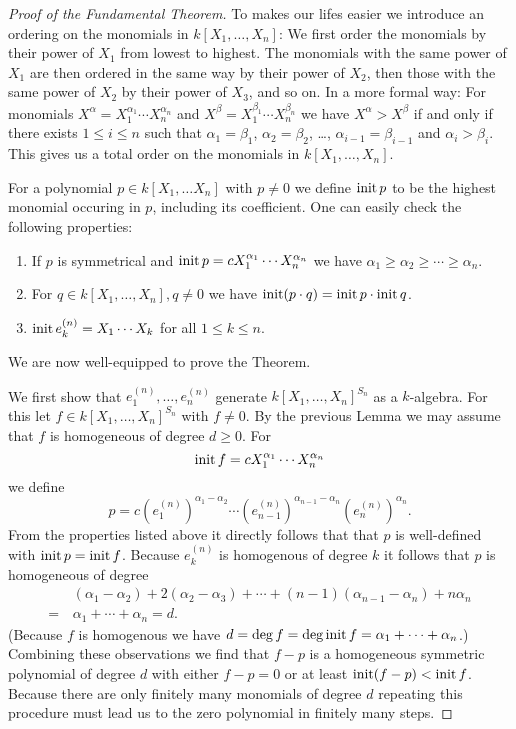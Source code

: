 \begin{proof}[Proof of the Fundamental Theorem]
  To makes our lifes easier we introduce an ordering on the monomials in $k[X_1, \dotsc, X_n]$:
  We first order the monomials by their power of $X_1$ from lowest to highest.
  The monomials with the same power of $X_1$ are then ordered in the same way by their power of $X_2$, then those with the same power of $X_2$ by their power of $X_3$, and so on.
  In a more formal way:
  For monomials $X^\alpha = X_1^{\alpha_1} \dotsm X_n^{\alpha_n}$ and $X^\beta = X_1^{\beta_1} \dotsm X_n^{\beta_n}$ we have $X^\alpha > X^\beta$ if and only if there exists $1 \leq i \leq n$ such that $\alpha_1 = \beta_1$, $\alpha_2 = \beta_2$, \dots, $\alpha_{i-1} = \beta_{i-1}$ and $\alpha_i > \beta_i$.
  This gives us a total order on the monomials in $k[X_1, \dotsc, X_n]$.
  
  For a polynomial $p \in k[X_1, \dotsc X_n]$ with $p \neq 0$ we define $\operatorname{init} p$ to be the highest monomial occuring in $p$, including its coefficient.
  One can easily check the following properties:
  \begin{enumerate}[label=\emph{\alph*)},leftmargin=*]
    \item
      If $p$ is symmetrical and $\operatorname{init} p = c X_1^{\alpha_1} \dotsm X_n^{\alpha_n}$ we have $\alpha_1 \geq \alpha_2 \geq \dotsb \geq \alpha_n$.
    \item
      For $q \in k[X_1, \dotsc, X_n], q \neq 0$ we have $\operatorname{init} (p \cdot q) = \operatorname{init} p \cdot \operatorname{init} q$.
    \item
      $\operatorname{init} e^{(n)}_k = X_1 \dotsm X_k$ for all $1 \leq k \leq n$.
  \end{enumerate}
  We are now well-equipped to prove the Theorem. 
  
  We first show that $e^{(n)}_1, \dotsc, e^{(n)}_n$ generate $k[X_1, \dotsc, X_n]^{S_n}$ as a $k$-algebra.
  For this let $f \in k[X_1, \dotsc, X_n]^{S_n}$ with $f \neq 0$.
  By the previous Lemma we may assume that $f$ is homogeneous of degree $d \geq 0$.
  For
  \[
      \operatorname{init} f
    = c X_1^{\alpha_1} \dotsm X_n^{\alpha_n}
  \]
  we define
  \[
      p
    =         c
              \left( e^{(n)}_1 \right)^{\alpha_1 - \alpha_2}
      \dotsm \left( e^{(n)}_{n-1} \right)^{\alpha_{n-1} - \alpha_n}
              \left( e^{(n)}_n \right)^{\alpha_n}.
  \]
  From the properties listed above it directly follows that that $p$ is well-defined with $\operatorname{init} p = \operatorname{init} f$.
  Because $e^{(n)}_k$ is homogenous of degree $k$ it follows that $p$ is homogeneous of degree
  \begin{align*}
     &\,  (\alpha_1-\alpha_2) + 2(\alpha_2-\alpha_3) + \dotsb + (n-1)(\alpha_{n-1}-\alpha_n)+n\alpha_n \\
    =&\,  \alpha_1 + \dotsb + \alpha_n
    =     d.
  \end{align*}
  (Because $f$ is homogenous we have $d = \deg f = \deg \operatorname{init} f = \alpha_1 + \dotsb + \alpha_n$.)
  Combining these observations we find that $f-p$ is a homogeneous symmetric polynomial of degree $d$ with either $f-p = 0$ or at least $\operatorname{init} (f-p) < \operatorname{init} f$.
  Because there are only finitely many monomials of degree $d$ repeating this procedure must lead us to the zero polynomial in finitely many steps.
  

\end{proof}
